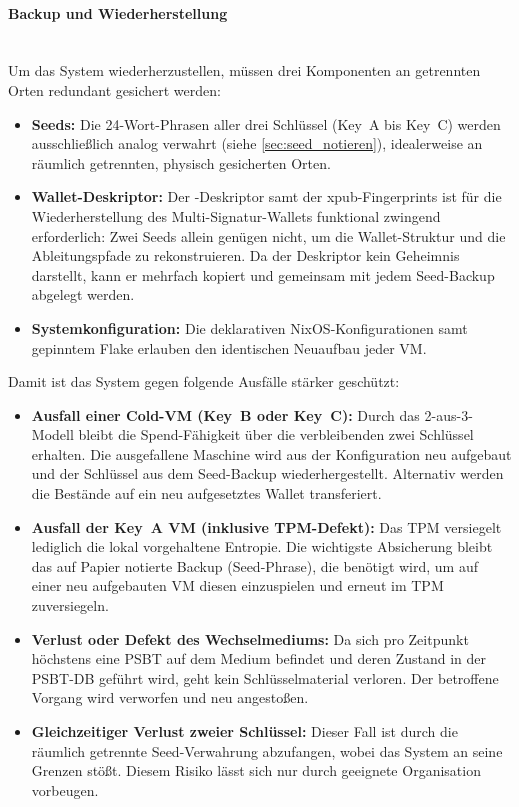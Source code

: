 \paragraph{Backup und Wiederherstellung} \label{sec:backup} \mbox{}\\
Um das System wiederherzustellen, müssen drei Komponenten an getrennten Orten redundant gesichert werden:
\begin{itemize}
    \item \textbf{Seeds:} Die 24-Wort-Phrasen aller drei Schlüssel (Key~A bis Key~C) werden ausschließlich analog verwahrt (siehe \ref{sec:seed_notieren}), idealerweise an räumlich getrennten, physisch gesicherten Orten.
    \item \textbf{Wallet-Deskriptor:} Der -Deskriptor samt der \ac{xpub}-Fingerprints ist für die Wiederherstellung des Multi-Signatur-Wallets funktional zwingend erforderlich: Zwei Seeds allein genügen nicht, um die Wallet-Struktur und die Ableitungspfade zu rekonstruieren. Da der Deskriptor kein Geheimnis darstellt, kann er mehrfach kopiert und gemeinsam mit jedem Seed-Backup abgelegt werden.
    \item \textbf{Systemkonfiguration:} Die deklarativen NixOS-Konfigurationen samt gepinntem Flake erlauben den identischen Neuaufbau jeder \ac{VM}.
\end{itemize}
Damit ist das System gegen folgende Ausfälle stärker geschützt:
\begin{itemize}
    \item \textbf{Ausfall einer Cold-\ac{VM} (Key~B oder Key~C):} Durch das 2-aus-3-Modell bleibt die Spend-Fähigkeit über die verbleibenden zwei Schlüssel erhalten. Die ausgefallene Maschine wird aus der Konfiguration neu aufgebaut und der Schlüssel aus dem Seed-Backup wiederhergestellt. Alternativ werden die Bestände auf ein neu aufgesetztes Wallet transferiert.
    \item \textbf{Ausfall der Key~A \ac{VM} (inklusive \ac{TPM}-Defekt):} Das \ac{TPM} versiegelt lediglich die lokal vorgehaltene Entropie. Die wichtigste Absicherung bleibt das auf Papier notierte Backup (Seed-Phrase), die benötigt wird, um auf einer neu aufgebauten \ac{VM} diesen einzuspielen und erneut im \ac{TPM} zuversiegeln.
    \item \textbf{Verlust oder Defekt des Wechselmediums:} Da sich pro Zeitpunkt höchstens eine \ac{PSBT} auf dem Medium befindet und deren Zustand in der \ac{PSBT}-\ac{DB} geführt wird, geht kein Schlüsselmaterial verloren. Der betroffene Vorgang wird verworfen und neu angestoßen.
    \item \textbf{Gleichzeitiger Verlust zweier Schlüssel:} Dieser Fall ist durch die räumlich getrennte Seed-Verwahrung abzufangen, wobei das System an seine Grenzen stößt. Diesem Risiko lässt sich nur durch geeignete Organisation vorbeugen.
\end{itemize}


